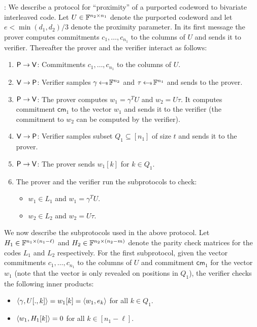 : We
describe a protocol for ``proximity'' of a purported codeword to bivariate
interleaved code. Let $U\in \mathbb{F}^{n_2\times n_1}$ denote the purported codeword and let
$e<\min(d_1,d_2)/3$ denote the proximity parameter. In its first message the
prover computes commitments $c_1,\ldots,c_{n_1}$ to the columns of $U$ and
sends it to verifier. Thereafter the prover and the verifier interact as
follows:
\begin{enumerate}[{\rm 1.}]
\item $\mathsf{P}\rightarrow \mathsf{V}$: Commitments $c_1,\ldots,c_{n_1}$ to the
columns of $U$.
\item $\mathsf{V}\rightarrow \mathsf{P}$: Verifier samples $\gamma\hskip2.3pt{\gets\!\!\mbox{\tiny${\$}$\normalsize}}\,
\mathbb{F}^{n_2}$ and $\tau\hskip2.3pt{\gets\!\!\mbox{\tiny${\$}$\normalsize}}\, \mathbb{F}^{n_1}$ and sends to the prover.
\item $\mathsf{P}\rightarrow \mathsf{V}$: The prover computes $w_1=\gamma^TU$ and
$w_2=U\tau$. It computes commitment $\mathsf{cm}_1$ to the
vector $w_1$ and sends it to the verifier (the commitment to $w_2$ can be computed by the
verifier). 
\item $\mathsf{V}\rightarrow \mathsf{P}$: Verifier samples subset $Q_1\subseteq
[n_1]$ of size $t$ and sends it to the prover.
\item $\mathsf{P}\rightarrow\mathsf{V}$: The prover sends $w_1[k]$ for $k\in Q_1$.
\item The prover and the verifier run the subprotocols to check:
  \begin{itemize}
  \item $w_1\in L_1$ and $w_1=\gamma^TU$.
  \item $w_2\in L_2$ and $w_2=U\tau$.
  \end{itemize}
\end{enumerate}
We now describe the subprotocols used in the above protocol.
Let $H_1\in \mathbb{F}^{n_1\times (n_1-\ell)}$ and $H_2\in \mathbb{F}^{n_2\times (n_2-m)}$
denote the parity check matrices for the codes $L_1$ and $L_2$
respectively. For the first subprotocol, given the vector commitments
$c_1,\ldots,c_{n_1}$ to the columns of $U$ and commitment $\mathsf{cm}_1$ for
the vector $w_1$ (note that the vector is only revealed on positions in $Q_1$), the verifier checks the following inner products:
\begin{itemize}
\item $\langle \gamma,U[.,k]\rangle=w_1[k]=\langle w_1,e_k\rangle$ for all $k\in Q_1$.
\item $\langle w_1,H_1[k]\rangle=0$ for all $k\in [n_1-\ell]$.
\end{itemize}
